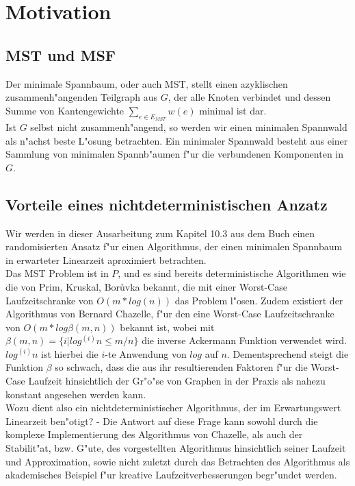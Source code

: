 \section{Motivation}

\subsection{MST und MSF}
Der minimale Spannbaum, oder auch MST, stellt einen azyklischen 
    zusammenh"angenden Teilgraph aus $G$, der alle Knoten verbindet und
    dessen Summe von Kantengewichte $\sum_{e \in E_{MST}} w(e)$
    minimal ist dar.\\
Ist $G$ selbst nicht zusammenh"angend, so werden wir einen minimalen Spannwald
    als n"achst beste L"osung betrachten.
    Ein minimaler Spannwald besteht aus einer Sammlung von minimalen 
    Spannb"aumen f"ur die verbundenen Komponenten in $G$.\\

\subsection{Vorteile eines nichtdeterministischen Anzatz}

Wir werden in dieser Ausarbeitung zum Kapitel 10.3 aus dem Buch
    \cite{randAlg}
    einen
    randomisierten Ansatz f"ur einen Algorithmus, der einen minimalen Spannbaum
    in erwarteter Linearzeit aproximiert betrachten.\\
Das MST Problem ist in $P$, und es sind bereits 
    deterministische Algorithmen wie die von
    Prim, Kruskal, Bor\r uvka bekannt, 
    die mit einer Worst-Case Laufzeitschranke 
    von $O(m * log(n))$ das Problem l"osen.
    Zudem existiert der Algorithmus von Bernard Chazelle, f"ur den eine
    Worst-Case Laufzeitschranke von $O(m * log \beta(m,n))$ bekannt ist, wobei
    mit
    $\beta(m,n) = \{i | log^{(i)} n \leq m / n\}$ die inverse Ackermann Funktion
    verwendet wird. 
    $log^{(i)} n$ ist hierbei die $i$-te Anwendung von $log$ auf $n$.
    Dementsprechend steigt die Funktion $\beta$ so schwach, dass die
    aus ihr resultierenden Faktoren f"ur die Worst-Case Laufzeit hinsichtlich
    der Gr"o"se von Graphen in der Praxis als nahezu konstant angesehen werden 
    kann.\\
Wozu dient also ein nichtdeterministischer Algorithmus, der im Erwartungswert 
    Linearzeit ben"otigt?
    - Die Antwort auf diese Frage kann sowohl durch die komplexe Implementierung
    des Algorithmus von Chazelle, als auch der Stabilit"at, bzw. G"ute,
    des vorgestellten Algorithmus hinsichtlich seiner Laufzeit und Approximation,
    sowie nicht zuletzt durch das Betrachten des Algorithmus als akademisches
    Beispiel f"ur kreative Laufzeitverbesserungen begr"undet werden.\\
